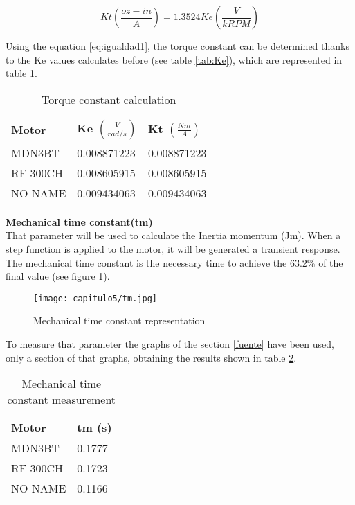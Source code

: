 \begin{equation}   
Kt\left(\frac{oz-in}{A}\right)= 1.3524 Ke \left(\frac{V}{kRPM}\right)
\label{eq:igualdad3}
\end{equation}


Using the equation \ref{eq:igualdad1}, the torque constant can be determined thanks to the Ke values calculates before (see table \ref{tab:Ke}), which are represented in table \ref{tab:Kt}.

\begin{table}[H]
\centering
\begin{tabular}{ | l | l |l |}
\hline\hline
	\textbf{Motor} & \textbf{Ke $\left(\frac{V}{rad/s}\right)$} & \textbf{Kt $\left(\frac{Nm}{A}\right)$}\\ \hline
	MDN3BT & 0.008871223 &	0.008871223		\\ \hline
RF-300CH & 0.008605915 &	0.008605915  \\ \hline
NO-NAME & 0.009434063 &		0.009434063	\\ \hline\hline 
\end{tabular}
\caption{Torque constant calculation} \label{tab:Kt}
\end{table}

\textbf{Mechanical time constant(tm)} \\ 
That parameter will be used to calculate the Inertia momentum (Jm). When a step function is applied to the motor, it will be generated a transient response. The mechanical time constant is the necessary time to achieve the 63.2\% of the final value (see figure \ref{fig:tm}).

\begin{figure}[H]
\centering
		\texttt{[image: capitulo5/tm.jpg]}
	\caption{Mechanical time constant representation \cite{tm}}
	\label{fig:tm}
\end{figure}

To measure that parameter the graphs of the section \ref{fuente} have been used, only a section of that graphs, obtaining the results shown in table \ref{tab:tm}. 

\begin{table}[H]
\centering
\begin{tabular}{ | l | l |}
\hline\hline
	\textbf{Motor} & \textbf{tm (s)} \\ \hline
	MDN3BT & 0.1777 \\ \hline
RF-300CH & 0.1723 \\ \hline
NO-NAME & 0.1166 \\ \hline\hline 
\end{tabular}
\caption{Mechanical time constant measurement} \label{tab:tm}
\end{table}\\

